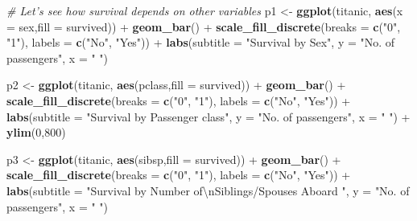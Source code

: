 \documentclass[12,]{article}
\newenvironment{Shaded}{\begin{snugshade}}{\end{snugshade}}
\newcommand{\KeywordTok}[1]{\textcolor[rgb]{0.13,0.29,0.53}{\textbf{{#1}}}}
\newcommand{\DataTypeTok}[1]{\textcolor[rgb]{0.13,0.29,0.53}{{#1}}}
\newcommand{\DecValTok}[1]{\textcolor[rgb]{0.00,0.00,0.81}{{#1}}}
\newcommand{\CharTok}[1]{\textcolor[rgb]{0.31,0.60,0.02}{{#1}}}
\newcommand{\StringTok}[1]{\textcolor[rgb]{0.31,0.60,0.02}{{#1}}}
\newcommand{\CommentTok}[1]{\textcolor[rgb]{0.56,0.35,0.01}{\textit{{#1}}}}
\newcommand{\NormalTok}[1]{{#1}}
\begin{document}
\begin{Shaded}
\begin{Highlighting}[]
  \CommentTok{# Let's see how survival depends on other variables}
\NormalTok{p1 <-}\StringTok{ }\KeywordTok{ggplot}\NormalTok{(titanic, }\KeywordTok{aes}\NormalTok{(}\DataTypeTok{x =} \NormalTok{sex,}\DataTypeTok{fill =} \NormalTok{survived)) +}\StringTok{ }
\StringTok{    }\KeywordTok{geom_bar}\NormalTok{() +}\StringTok{ }\KeywordTok{scale_fill_discrete}\NormalTok{(}\DataTypeTok{breaks =} \KeywordTok{c}\NormalTok{(}\StringTok{"0"}\NormalTok{, }\StringTok{"1"}\NormalTok{), }\DataTypeTok{labels =} \KeywordTok{c}\NormalTok{(}\StringTok{"No"}\NormalTok{, }\StringTok{"Yes"}\NormalTok{)) +}\StringTok{ }
\StringTok{    }\KeywordTok{labs}\NormalTok{(}\DataTypeTok{subtitle =} \StringTok{"Survival by Sex"}\NormalTok{, }\DataTypeTok{y =} \StringTok{"No. of passengers"}\NormalTok{, }\DataTypeTok{x =} \StringTok{" "}\NormalTok{)}

\NormalTok{p2 <-}\StringTok{ }\KeywordTok{ggplot}\NormalTok{(titanic, }\KeywordTok{aes}\NormalTok{(pclass,}\DataTypeTok{fill =} \NormalTok{survived)) +}\StringTok{ }
\StringTok{    }\KeywordTok{geom_bar}\NormalTok{() +}\StringTok{ }\KeywordTok{scale_fill_discrete}\NormalTok{(}\DataTypeTok{breaks =} \KeywordTok{c}\NormalTok{(}\StringTok{"0"}\NormalTok{, }\StringTok{"1"}\NormalTok{), }\DataTypeTok{labels =} \KeywordTok{c}\NormalTok{(}\StringTok{"No"}\NormalTok{, }\StringTok{"Yes"}\NormalTok{)) +}\StringTok{ }
\StringTok{    }\KeywordTok{labs}\NormalTok{(}\DataTypeTok{subtitle =} \StringTok{"Survival by Passenger class"}\NormalTok{, }\DataTypeTok{y =} \StringTok{"No. of passengers"}\NormalTok{, }\DataTypeTok{x =} \StringTok{" "}\NormalTok{) +}\StringTok{ }
\StringTok{    }\KeywordTok{ylim}\NormalTok{(}\DecValTok{0}\NormalTok{,}\DecValTok{800}\NormalTok{)}
    
\NormalTok{p3 <-}\StringTok{ }\KeywordTok{ggplot}\NormalTok{(titanic, }\KeywordTok{aes}\NormalTok{(sibsp,}\DataTypeTok{fill =} \NormalTok{survived)) +}\StringTok{ }
\StringTok{    }\KeywordTok{geom_bar}\NormalTok{() +}\StringTok{ }\KeywordTok{scale_fill_discrete}\NormalTok{(}\DataTypeTok{breaks =} \KeywordTok{c}\NormalTok{(}\StringTok{"0"}\NormalTok{, }\StringTok{"1"}\NormalTok{), }\DataTypeTok{labels =} \KeywordTok{c}\NormalTok{(}\StringTok{"No"}\NormalTok{, }\StringTok{"Yes"}\NormalTok{)) +}\StringTok{ }
\StringTok{    }\KeywordTok{labs}\NormalTok{(}\DataTypeTok{subtitle =} \StringTok{"Survival by Number of}\CharTok{\textbackslash{}n}\StringTok{Siblings/Spouses Aboard "}\NormalTok{, }
         \DataTypeTok{y =} \StringTok{"No. of passengers"}\NormalTok{, }\DataTypeTok{x =} \StringTok{" "}\NormalTok{)}


\end{Highlighting}
\end{Shaded}
\end{document}
